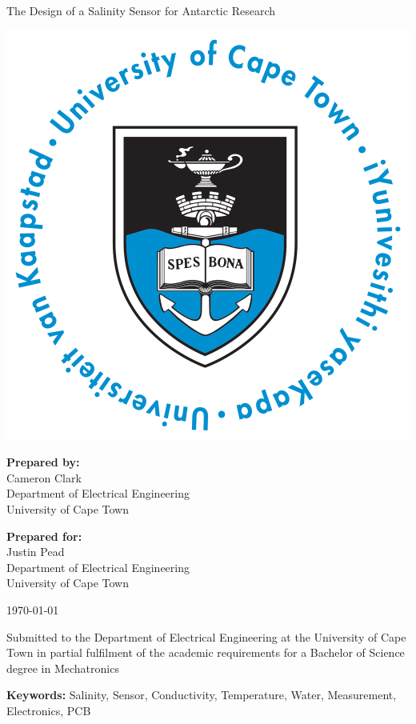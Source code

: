 \thispagestyle{empty}
\begin{center}
    
\Huge

\vspace{5cm}

The Design of a Salinity Sensor for Antarctic Research

\vspace{1cm}

\includegraphics[width=0.4\linewidth]{FrontMatter/UCT_logo}

\vfill

\large
\textbf{Prepared by:}\\
Cameron Clark\\
Department of Electrical Engineering\\
University of Cape Town\\

\vspace{1cm}

\textbf{Prepared for:}\\
Justin Pead\\
Department of Electrical Engineering\\
University of Cape Town

\vspace{1cm}

\today

\vspace{1cm}

Submitted to the Department of Electrical Engineering at the University of Cape Town in partial
fulfilment of the academic requirements for a Bachelor of Science degree in Mechatronics


\vspace{1cm}
\textbf{Keywords:} Salinity, Sensor, Conductivity, Temperature, Water, Measurement, Electronics, PCB

\end{center}